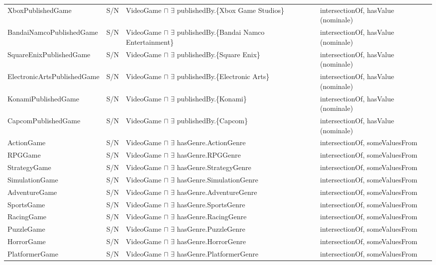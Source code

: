 \begin{longtable}{ll>{\raggedright\arraybackslash}p{6.4cm}>{\raggedright\arraybackslash}p{3.4cm}}
XboxPublishedGame     & S/N & VideoGame $\sqcap$ $\exists$ publishedBy.\{Xbox Game Studios\} & intersectionOf, hasValue (nominale) \\
BandaiNamcoPublishedGame& S/N & VideoGame $\sqcap$ $\exists$ publishedBy.\{Bandai Namco Entertainment\} & intersectionOf, hasValue (nominale) \\
SquareEnixPublishedGame& S/N & VideoGame $\sqcap$ $\exists$ publishedBy.\{Square Enix\} & intersectionOf, hasValue (nominale) \\
ElectronicArtsPublishedGame& S/N & VideoGame $\sqcap$ $\exists$ publishedBy.\{Electronic Arts\} & intersectionOf, hasValue (nominale) \\
KonamiPublishedGame   & S/N & VideoGame $\sqcap$ $\exists$ publishedBy.\{Konami\} & intersectionOf, hasValue (nominale) \\
CapcomPublishedGame   & S/N & VideoGame $\sqcap$ $\exists$ publishedBy.\{Capcom\} & intersectionOf, hasValue (nominale) \\
ActionGame            & S/N & VideoGame $\sqcap$ $\exists$ hasGenre.ActionGenre & intersectionOf, someValuesFrom \\
RPGGame               & S/N & VideoGame $\sqcap$ $\exists$ hasGenre.RPGGenre & intersectionOf, someValuesFrom \\
StrategyGame          & S/N & VideoGame $\sqcap$ $\exists$ hasGenre.StrategyGenre & intersectionOf, someValuesFrom \\
SimulationGame        & S/N & VideoGame $\sqcap$ $\exists$ hasGenre.SimulationGenre & intersectionOf, someValuesFrom \\
AdventureGame         & S/N & VideoGame $\sqcap$ $\exists$ hasGenre.AdventureGenre & intersectionOf, someValuesFrom \\
SportsGame            & S/N & VideoGame $\sqcap$ $\exists$ hasGenre.SportsGenre & intersectionOf, someValuesFrom \\
RacingGame            & S/N & VideoGame $\sqcap$ $\exists$ hasGenre.RacingGenre & intersectionOf, someValuesFrom \\
PuzzleGame            & S/N & VideoGame $\sqcap$ $\exists$ hasGenre.PuzzleGenre & intersectionOf, someValuesFrom \\
HorrorGame            & S/N & VideoGame $\sqcap$ $\exists$ hasGenre.HorrorGenre & intersectionOf, someValuesFrom \\
PlatformerGame        & S/N & VideoGame $\sqcap$ $\exists$ hasGenre.PlatformerGenre & intersectionOf, someValuesFrom \\

\end{longtable}
